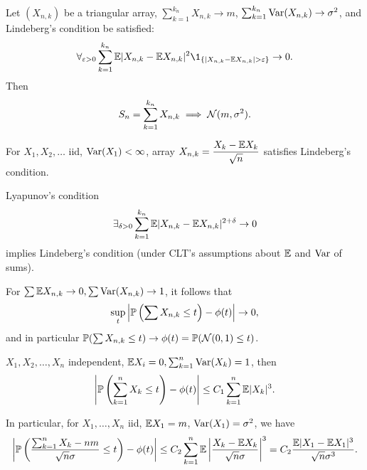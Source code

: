 



	\begin{theorem}
		Let $(X_{n,k})$ be a triangular array,
		$\sum_{k=1}^{k_n} X_{n,k} \to m$,
		$\sum_{k=1}^{k_n} \var(X_{n,k}) \to \sigma^2$,
		and Lindeberg's condition be satisfied:
		$$ \forall_{\varepsilon>0} \sum_{k=1}^{k_n}
			\E |X_{n,k} - \E X_{n,k} |^2 
			\1_{\{ |X_{n,k} - \E X_{n,k} | > \varepsilon \}} \to 0.$$
		Then $$S_n = \sum_{k=1}^{k_n} X_{n,k} \implies \N(m, \sigma^2).$$
	\end{theorem}
	
	\begin{proposition}
		For $X_1, X_2, \ldots$ iid, $\var(X_1)<\infty$,
		array $\displaystyle X_{n,k} = \frac{X_k - \E X_k}{\sqrt{n}}$
		satisfies Lindeberg's condition.
	\end{proposition}
	
	\begin{proposition}
		Lyapunov's condition
		$$ \exists_{\delta>0} \sum_{k=1}^{k_n}
			\E |X_{n,k} - \E X_{n,k} |^{2 + \delta} \to 0 $$
		implies Lindeberg's condition (under CLT's assumptions
		about $\E$ and $\var$ of sums).
	\end{proposition}
	
	\begin{corollary}
		For $\sum \E X_{n,k} \to 0, \sum \var(X_{n,k}) \to 1$,
		it follows that $$ \sup_t \left| \P\left(\sum X_{n,k} \leq t\right)
			- \phi(t)\right| \to 0,$$
		and in particular $\P(\sum X_{n,k} \leq t) \to \phi(t)
		= \P(\N(0,1) \leq t)$.
	\end{corollary}
	
	\begin{theorem}
		$X_1, X_2, \ldots, X_n$ independent,
		$\E X_i = 0, \sum_{k=1}^n \var(X_k) = 1$, then
		$$\left| \P\left(\sum_{k=1}^n X_k \leq t\right) - \phi(t) \right|
		\leq C_1 \sum_{k=1}^n \E |X_k|^3.$$
	\end{theorem}
	
	\begin{corollary}
		In particular, for $X_1, \ldots, X_n$ iid, $\E X_1 = m$,
		$\var(X_1) = \sigma^2$, we have
		$$\left| \P\left(\frac{\sum_{k=1}^n X_k - nm}{\sqrt{n} \sigma} \leq t \right)
				- \phi(t) \right|
		\leq C_2 \sum_{k=1}^n \E \left| \frac{X_k - \E X_k}{\sqrt{n}\sigma}\right|^3
		= C_2 \frac{\E |X_1 - \E X_1|^3}{\sqrt{n} \sigma^3}.$$
	\end{corollary}
	
